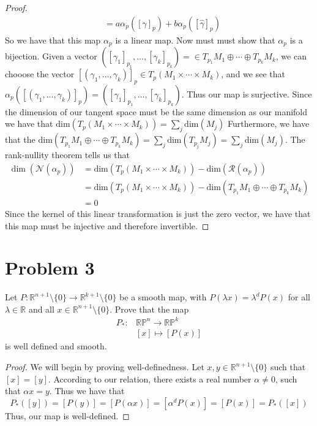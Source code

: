 \documentclass[a4paper]{article}
\begin{document}
\begin{proof}
\[\begin{aligned}
                                               &= a\alpha_p([\gamma]_p) + b \alpha_p([\hat{\gamma}]_p)
    \end{aligned}
  \]
  So we have that this map $\alpha_p$ is a linear map. Now must must show that $\alpha_p$ is a bijection. Given a vector $([\gamma_1]_{p_1}, \dots, [\gamma_k]_{p_k}) = \in T_{p_1}M_1 \oplus \cdots \oplus T_{p_k}M_k$, we can chooose the vector $[(\gamma_1, \dots, \gamma_k)]_p \in T_p(M_1 \times \cdots \times M_k)$, and we see that $\alpha_p([(\gamma_1, \dots, \gamma_k)]_p) = ([\gamma_1]_{p_1}, \dots, [\gamma_k]_{p_k})$. Thus our map is surjective. Since the dimension of our tangent space must be the same dimension as our manifold we have that 
  $\text{dim}\left(T_p(M_1 \times \cdots \times M_k)\right) = \sum_j \text{dim}(M_j)$ Furthermore, we have that the $\text{dim} \left( T_{p_1}M_1 \oplus \cdots \oplus T_{p_k}M_k \right) = \sum_j \text{dim}(T_{p_j}M_j) = \sum_j \text{dim}(M_j)$. The rank-nullity theorem tells us that 
\[
  \begin{aligned}
    \dim\left(\mathcal{N}(\alpha_p)\right) &= \text{dim}\left(T_p(M_1 \times \cdots \times M_k)\right)  - \text{dim}\left(\mathcal{R}(\alpha_p)\right) \\
                                           &=  \text{dim}\left(T_p(M_1 \times \cdots \times M_k)\right)  - \text{dim} \left( T_{p_1}M_1 \oplus \cdots \oplus T_{p_k}M_k \right) \\
                                           &= 0
  \end{aligned}
\]
Since the kernel of this linear transformation is just the zero vector, we have that this map must be injective and therefore invertible.

\end{proof}

\section*{Problem 3}%
Let $P: \mathds{R}^{n+1} \setminus \{0\} \rightarrow \mathds{R}^{k+1} \setminus \{0\}$ be a smooth map, with $P(\lambda x) = \lambda^dP(x)$ for all $\lambda \in \mathds{R}$ and all $x \in \mathds{R}^{n+1} \setminus \{0\}$. Prove that the map 
\[
  \begin{aligned}
    P_{*}: &\mathds{RP}^n \rightarrow \mathds{RP}^k \\
           &[x] \mapsto [P(x)]
  \end{aligned}
\]
is well defined and smooth.

\begin{proof}
  We will begin by proving well-definedness. Let $x,y \in \mathds{R}^{n+1} \setminus \{0\}$ such that $[x] = [y]$. According to our relation, there exists a real number $\alpha \neq 0$, such that $\alpha x = y$. Thus we have that
  \[
    P_{*}([y]) = [P(y)] = [P(\alpha x)] = [\alpha^d P(x)] = [P(x)] = P_{*}([x])
  \]
Thus, our map is well-defined. 
\end{proof}
\end{document}

